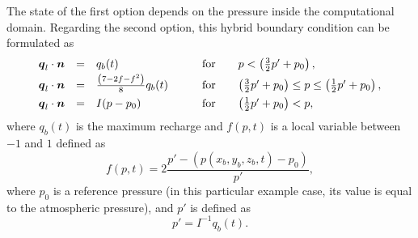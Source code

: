 The state of the first option depends on the pressure inside the computational domain.
Regarding the second option, this hybrid boundary condition \citep[based on][]{hamm2000} can be formulated as
\begin{equation} \label{eq:fifth_bc_richard}
\begin{array} {lllll}
  {\boldsymbol{q}}_l \cdot \boldsymbol{n} & = & q_{b}(t) & \qquad \text{for} \quad &  p < \left( \frac{3}{2} p' + p_{0} \right), \\[0.5ex]
  {\boldsymbol{q}}_l \cdot \boldsymbol{n} & = & \frac{\left(  7-2f-f^{2}  \right)}{8} q_{b}(t) 
                    & \qquad \text{for} \quad &  \left( \frac32 p' + p_{0} \right) \leq p \leq \left( \frac12 p' + p_{0} \right), \\[1.0ex]
  {\boldsymbol{q}}_l \cdot \boldsymbol{n} & = & I (p - p_{0}) &  \qquad \text{for} \quad & \left( \frac{1}{2} p' + p_{0} \right) < p, 
\end{array} 
\end{equation}
where $q_{b}(t)$ is the maximum recharge and $f(p,t)$ is a local variable between $-1$ and $1$ 
defined as 
\begin{equation}
  f(p,t) = 2 \frac{p'- (p(x_{b},y_{b},z_{b},t) - p_{0}) }{p'},
\end{equation}
where $p_{0}$ is a reference pressure (in this particular example case, its value is equal to 
the atmospheric pressure), and $p'$ is defined as 
\begin{equation}
  p' = I^{-1} q_{b}(t).
\end{equation}















